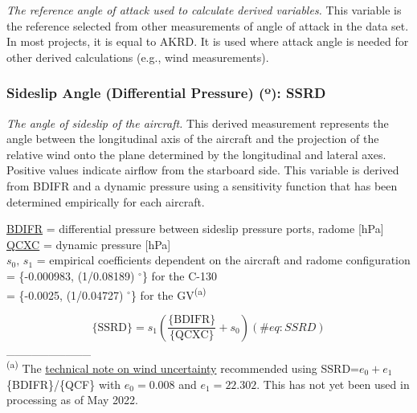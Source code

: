 \documentclass[
  english,
]{book}
\begin{document}
\emph{The reference angle of attack used to calculate derived
variables.} This variable is the reference selected from other
measurements of angle of attack in the data set. In most projects, it is
equal to AKRD. It is used where attack angle is needed for other derived
calculations (e.g., wind measurements).

\hypertarget{ssrd}{%
\subsubsection*{\texorpdfstring{Sideslip Angle (Differential Pressure)
({º}):
SSRD}{Sideslip Angle (Differential Pressure) (º): SSRD}}\label{ssrd}}

\emph{The angle of sideslip of the aircraft.} This derived measurement
represents the angle between the longitudinal axis of the aircraft and
the projection of the relative wind onto the plane determined by the
longitudinal and lateral axes. Positive values indicate airflow from the
starboard side. This variable is derived from BDIFR and a dynamic
pressure using a sensitivity function that has been determined
empirically for each aircraft.

\protect\hyperlink{bdifr}{BDIFR} = differential pressure between
sideslip pressure ports, radome {[}hPa{]}\\
\protect\hyperlink{qcx}{QCXC} = dynamic pressure {[}hPa{]}\\
\(s_{0},\,s{}_{1}\) = empirical coefficients dependent on the aircraft
and radome configuration\\
\hspace*{0.333em}\hspace*{0.333em}\hspace*{0.333em}\hspace*{0.333em}\hspace*{0.333em}
= \{-0.000983, (1/0.08189) \(^\circ\)\} for the C-130\\
\hspace*{0.333em}\hspace*{0.333em}\hspace*{0.333em}\hspace*{0.333em}\hspace*{0.333em}
= \{-0.0025, (1/0.04727) \(^\circ\)\} for the GV\textsuperscript{(a)}

\begin{equation}
\mathrm{\{SSRD\}} = s_{1}(\frac{\mathrm{\{BDIFR\}}}{\{\mathrm{QCXC}\}}+s_{0})
(\#eq:SSRD)
\end{equation} \_\_\_\_\_\_\_\_\_\_\\
\textsuperscript{(a)} The
\href{http://dx.doi.org/10.5065/D60G3HJ8}{technical note on wind
uncertainty} recommended using SSRD=\(e_{0}+e_{1}\)\{BDIFR\}/\{QCF\}
with \(e_{0}=0.008\) and \(e_{1}=22.302\). This has not yet been used in
processing as of May 2022.
\end{document}
